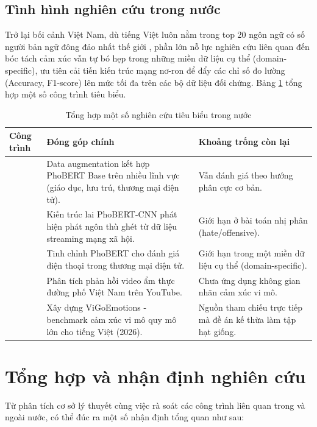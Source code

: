 \subsection{Tình hình nghiên cứu trong nước}
Trở lại bối cảnh Việt Nam, dù tiếng Việt luôn nằm trong top 20 ngôn ngữ có số người bản ngữ đông đảo nhất thế giới \parencite{ethnologue_2026}, phần lớn nỗ lực nghiên cứu liên quan đến bóc tách cảm xúc vẫn tự bó hẹp trong những miền dữ liệu cụ thể (domain-specific), ưu tiên cải tiến kiến trúc mạng nơ-ron để đẩy các chỉ số đo lường (Accuracy, F1-score) lên mức tối đa trên các bộ dữ liệu đối chứng. Bảng \ref{tab:related_domestic} tổng hợp một số công trình tiêu biểu.

\begin{table}[H]
\centering
\caption{Tổng hợp một số nghiên cứu tiêu biểu trong nước}
\label{tab:related_domestic}
\begin{tabular}{|p{3cm}|p{6.5cm}|p{4.5cm}|}
\hline
\textbf{Công trình} & \textbf{Đóng góp chính} & \textbf{Khoảng trống còn lại} \\ \hline
\textcite{le2021nghiencuu} & Data augmentation kết hợp PhoBERT Base trên nhiều lĩnh vực (giáo dục, lưu trú, thương mại điện tử). & Vẫn đánh giá theo hướng phân cực cơ bản. \\ \hline
\textcite{quoc2023vietnamese} & Kiến trúc lai PhoBERT-CNN phát hiện phát ngôn thù ghét từ dữ liệu streaming mạng xã hội. & Giới hạn ở bài toán nhị phân (hate/offensive). \\ \hline
\textcite{minh2024fine} & Tinh chỉnh PhoBERT cho đánh giá điện thoại trong thương mại điện tử. & Giới hạn trong một miền dữ liệu cụ thể (domain-specific). \\ \hline
\textcite{nguyen2025like} & Phân tích phản hồi video ẩm thực đường phố Việt Nam trên YouTube. & Chưa ứng dụng không gian nhãn cảm xúc vi mô. \\ \hline
\textcite{hung2026vigoemotions} & Xây dựng ViGoEmotions - benchmark cảm xúc vi mô quy mô lớn cho tiếng Việt (2026). & Nguồn tham chiếu trực tiếp mà đề án kế thừa làm tập hạt giống. \\ \hline
\end{tabular}
\end{table}

\section{Tổng hợp và nhận định nghiên cứu}
Từ phân tích cơ sở lý thuyết cùng việc rà soát các công trình liên quan trong và ngoài nước, có thể đúc ra một số nhận định tổng quan như sau:

